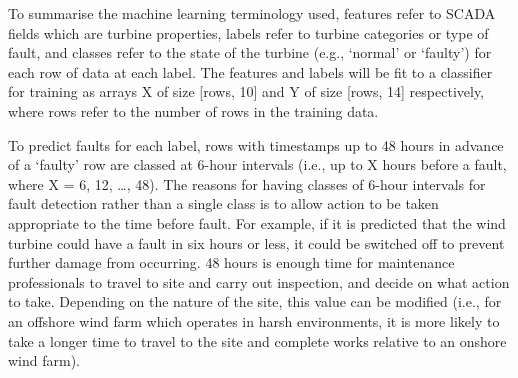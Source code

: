To summarise the machine learning terminology used, features refer to SCADA fields which are turbine properties, labels refer to turbine categories or type of fault, and classes refer to the state of the turbine (e.g., `normal' or `faulty') for each row of data at each label. The features and labels will be fit to a classifier for training as arrays X of size [rows, 10] and Y of size [rows, 14] respectively, where rows refer to the number of rows in the training data.

To predict faults for each label, rows with timestamps up to 48 hours in advance of a `faulty' row are classed at 6-hour intervals (i.e., up to X hours before a fault, where X = 6, 12, \dots, 48). The reasons for having classes of 6-hour intervals for fault detection rather than a single class is to allow action to be taken appropriate to the time before fault. For example, if it is predicted that the wind turbine could have a fault in six hours or less, it could be switched off to prevent further damage from occurring. 48 hours is enough time for maintenance professionals to travel to site and carry out inspection, and decide on what action to take. Depending on the nature of the site, this value can be modified (i.e., for an offshore wind farm which operates in harsh environments, it is more likely to take a longer time to travel to the site and complete works relative to an onshore wind farm).

